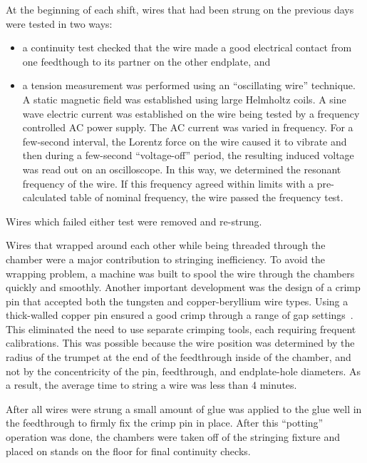 At the beginning of each shift, wires that had been strung on the previous days
were tested in two ways:
\begin{itemize}
\item a continuity test checked that the wire made a good electrical contact
from one feedthough to its partner on the other endplate, and
\item a tension measurement was performed using an ``oscillating wire'' technique.
A static magnetic field was established using large Helmholtz coils.  A sine
wave electric current was established on the wire being tested by a frequency
controlled AC power supply.  The AC current was varied in frequency.  For a 
few-second interval, the Lorentz force on the wire caused it to vibrate and
then during a few-second ``voltage-off'' period, the resulting induced voltage
was read out on an oscilloscope.  In this way, we determined the resonant frequency
of the wire.  If this frequency agreed within limits with a pre-calculated
table of nominal frequency, the wire passed the frequency test.
\end{itemize}
Wires which failed either test were removed and re-strung.

  Wires that wrapped around each other while being threaded through the chamber 
were a major contribution to stringing inefficiency. To avoid the wrapping
problem, a machine was built to spool the wire through the chambers quickly and smoothly.
Another important development was the design of a crimp pin 
that accepted both the tungsten and copper-beryllium wire types.  Using a 
thick-walled 
copper pin ensured a good crimp through a range of gap settings~\cite{sbc}.  This 
eliminated the need to use separate crimping tools, each requiring frequent 
calibrations.  This was possible because the wire position was determined by the 
radius of the trumpet at the end of the feedthrough inside of the chamber, and 
not by the concentricity of the pin, feedthrough, and endplate-hole diameters. 
As a result, the average time to string a wire was less than 4 minutes.

After all wires were strung
a small amount of glue was applied to the glue well
in the feedthrough to firmly fix the crimp pin in place.  After this ``potting''
operation was done, the chambers were taken off of the stringing fixture and
placed on stands on the floor for final continuity checks.









